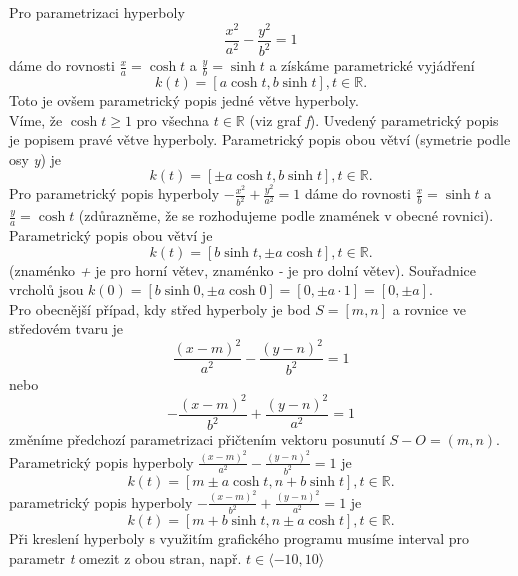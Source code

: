 			\clearpage
			\noindent Pro parametrizaci hyperboly
			$$\frac{x^2}{a^2}-\frac{y^2}{b^2}=1$$
			dáme do rovnosti $\frac{x}{a}=\cosh{t}$ a $\frac{y}{b}=\sinh{t}$ a získáme parametrické vyjádření
			$$k(t)=\left[a\cosh{t}, b\sinh{t}\right], t \in \mathbb{R}.$$
			Toto je ovšem parametrický popis jedné větve hyperboly. \\
			Víme, že  $\cosh{t} \geq 1$ pro všechna $t \in \mathbb{R}$ (viz graf \textit{f}). Uvedený parametrický popis je popisem pravé větve hyperboly. Parametrický popis obou větví (symetrie podle osy \textit{y}) je
			$$k(t)=\left[\pm a\cosh{t}, b\sinh{t}\right], t \in \mathbb{R}.$$
			Pro parametrický popis hyperboly  $-\frac{x^2}{b^2}+\frac{y^2}{a^2}=1$ dáme do rovnosti $\frac{x}{b}=\sinh{t}$ a $\frac{y}{a}=\cosh{t}$ (zdůrazněme, že se rozhodujeme podle znamének v obecné rovnici). \\
			Parametrický popis obou větví je
			$$k(t)=\left[b\sinh{t}, \pm a\cosh{t} \right], t \in \mathbb{R}.$$
			(znaménko \textit{+} je pro horní větev, znaménko \textit{-} je pro dolní větev).
			Souřadnice vrcholů jsou $k(0)=[b\sinh{0}, \pm a\cosh{0}] = [0, \pm a \cdot 1] = [0, \pm a]$. \\
			Pro obecnější případ, kdy střed hyperboly je bod $S=[m, n]$ a rovnice ve středovém tvaru je
			$$\frac{(x-m)^2}{a^2}-\frac{(y-n)^2}{b^2}=1$$
			nebo
			$$-\frac{(x-m)^2}{b^2}+\frac{(y-n)^2}{a^2}=1$$
			změníme předchozí parametrizaci přičtením vektoru posunutí $S-O=(m, n)$. \\
			Parametrický popis hyperboly $\frac{(x-m)^2}{a^2}-\frac{(y-n)^2}{b^2}=1$ je
			$$k(t)=[m \pm a\cosh{t}, n+b\sinh{t}], t \in \mathbb{R}.$$
			parametrický popis hyperboly $-\frac{(x-m)^2}{b^2}+\frac{(y-n)^2}{a^2}=1$ je
			$$k(t)=[m+b\sinh{t}, n \pm a\cosh{t}], t \in \mathbb{R}.$$
			Při kreslení hyperboly s využitím grafického programu musíme interval pro parametr \textit{t} omezit z obou stran, např. $t \in \langle-10, 10 \rangle$
			\clearpage
